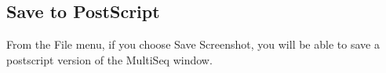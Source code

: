\subsection{Save to PostScript}  From the \textsf{File} menu, if you
choose \textsf{Save Screenshot}, you will be able to save a postscript
version of the MultiSeq window.


